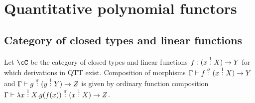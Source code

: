 \documentclass[12pt,a4paper]{article}
\begin{document}

\section{Quantitative polynomial functors}
\subsection{Category of closed types and linear functions}
\label{sec:cat-closed-types}
Let $\cC$ be the category of closed types and linear functions $f : (x \overset{1}{:} X) \to Y $ for which derivations in QTT exist. Composition of morphisms $\Gamma \vdash f \overset{\sigma}{:} (x \overset{1}{:} X) \to Y$ and $\Gamma \vdash g \overset{\sigma}{:} (y \overset{1}{:} Y) \to Z$ is given by ordinary function composition $\Gamma \vdash \lambda x \overset{1}{:} X. g(f(x)) \overset{\sigma}{:} (x \overset{1}{:} X) \to Z $.
\end{document}
